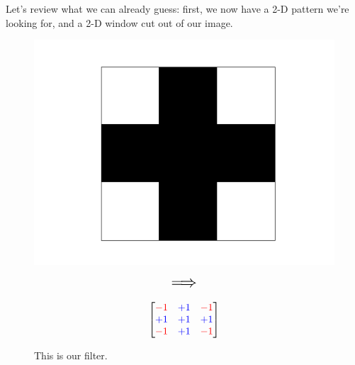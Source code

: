         Let's review what we can already guess: first, we now have a 2-D pattern we're looking for, and a 2-D window cut out of our image.
        
        \begin{figure}[ht]
            \begin{minipage}{.35\textwidth}
              \centering
              \includegraphics[width=.9\linewidth]{images/convolutional_neural_networks_images/crossgrid.png} 
            \end{minipage}
            \begin{minipage}{.3\textwidth}
                \centering
                $$\mathlarger{\mathlarger{\mathlarger{\implies}}}$$
            \end{minipage}
            \begin{minipage}{.1\textwidth}
                \centering
              \[
              \begin{bmatrix}
                  \textcolor{red}{-1} & \textcolor{blue}{+1} & \textcolor{red}{-1} \\
                  \textcolor{blue}{+1} & \textcolor{blue}{+1} & \textcolor{blue}{+1} \\
                  \textcolor{red}{-1} & \textcolor{blue}{+1} & \textcolor{red}{-1}
              \end{bmatrix}
              \]
            \end{minipage}
            \caption*{This is our filter.}
        \end{figure}
        
